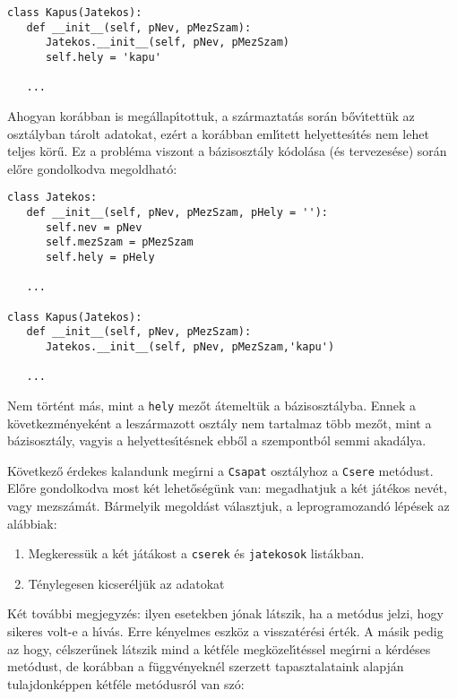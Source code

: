 \begin{Verbatim}[fontsize=\small]
class Kapus(Jatekos):
   def __init__(self, pNev, pMezSzam):
      Jatekos.__init__(self, pNev, pMezSzam)
      self.hely = 'kapu' 

   ...
\end{Verbatim}

Ahogyan kor\'abban is meg\'allap\'{\i}tottuk, a sz\'armaztat\'as sor\'an b\H{o}\-v\'{\i}\-tet\-t\"uk az osz\-t\'aly\-ban 
t\'arolt adatokat, ez\'ert a kor\'abban eml\'{\i}tett helyettes\'{\i}t\'es nem lehet teljes k\"or\H{u}. Ez a probl\'ema 
viszont a b\'azisoszt\'aly k\'odol\'asa (\'es tervezes\'ese) sor\'an el\H{o}re gondolkodva megoldhat\'o:

\begin{Verbatim}[fontsize=\small]
class Jatekos:
   def __init__(self, pNev, pMezSzam, pHely = ''):
      self.nev = pNev
      self.mezSzam = pMezSzam
      self.hely = pHely

   ...

class Kapus(Jatekos):
   def __init__(self, pNev, pMezSzam):
      Jatekos.__init__(self, pNev, pMezSzam,'kapu')

   ...   
\end{Verbatim}

Nem t\"ort\'ent m\'as, mint a {\tt hely} mez\H{o}t \'atemelt\"uk a b\'azisoszt\'alyba. Ennek a k\"ovetkezm\'enyek\'ent a 
lesz\'armazott oszt\'aly nem tartalmaz t\"obb mez\H{o}t, mint a b\'azisoszt\'aly, vagyis a helyettes\'{\i}t\'esnek ebb\H{o}l 
a szempontb\'ol semmi akad\'alya.

K\"ovetkez\H{o} \'erdekes kalandunk meg\'{\i}rni a {\tt Csapat} oszt\'alyhoz a {\tt Csere} met\'odust. El\H{o}re gondolkodva 
most k\'et lehet\H{o}s\'eg\"unk van: megadhatjuk a k\'et j\'at\'ekos nev\'et, vagy mezsz\'am\'at. B\'armelyik megold\'ast 
v\'alasztjuk, a leprogramozand\'o l\'ep\'esek az al\'abbiak:

\begin{enumerate}
   \item Megkeress\"uk a k\'et j\'at\'akost a {\tt cserek} \'es {\tt jatekosok} list\'akban. 
   \item T\'enylegesen kicser\'elj\"uk az adatokat
\end{enumerate}

K\'et tov\'abbi megjegyz\'es: ilyen esetekben j\'onak l\'atszik, ha a met\'odus jelzi, hogy sikeres volt-e a h\'{\i}v\'as. 
Erre k\'enyelmes eszk\"oz a visszat\'er\'esi \'ert\'ek. A m\'asik pedig az hogy, c\'elszer\H{u}nek l\'atszik mind a 
k\'etf\'ele megk\"ozel\'{\i}t\'essel meg\'{\i}rni a k\'erd\'eses met\'odust, de kor\'abban a f\"uggv\'enyekn\'el szerzett 
tapasztalataink alapj\'an tulajdonk\'eppen k\'etf\'ele met\'odusr\'ol van sz\'o:

